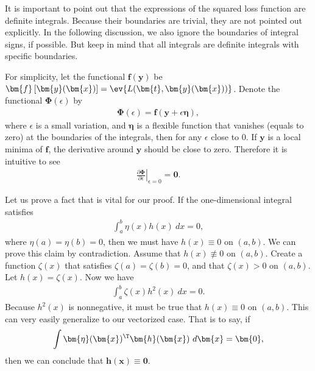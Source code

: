 \begin{answer}{}
	It is important to point out that the expressions of the squared loss function are definite integrals. Because their boundaries are trivial, they are not pointed out explicitly. In the following discussion, we also ignore the boundaries of integral signs, if possible. But keep in mind that all integrals are definite integrals with specific boundaries.
	
	For simplicity, let the functional $\bm{f}(\bm{y})$ be $\bm{f}\left[\bm{y}(\bm{x})\right] = \ev{L(\bm{t}, \bm{y}(\bm{x}))}$. Denote the functional $\bm{\Phi}(\epsilon)$ by
	\begin{align}
		\bm{\Phi}(\epsilon) = \bm{f}(\bm{y} + \epsilon\bm{\eta}),
	\end{align}
	where $\epsilon$ is a small variation, and $\bm{\eta}$ is a flexible function that vanishes (equals to zero) at the boundaries of the integrals, then for any $\epsilon$ close to $0$. If $\bm{y}$ is a local minima of $\bm{f}$, the derivative around $\bm{y}$ should be close to zero. Therefore it is intuitive to see
	\begin{align}\label{1.25eqn1}
		\left.\frac{\partial \bm{\Phi}}{\partial \epsilon}\right\lvert_{\epsilon = 0} = \bm{0}.
	\end{align}
	
	Let us prove a fact that is vital for our proof. If the one-dimensional integral satisfies
	\begin{align}
		\int_{a}^{b} \eta(x)h(x)\ dx = 0,
	\end{align}
	where $\eta(a) = \eta(b) = 0$, then we must have $h(x) \equiv 0$ on $(a, b)$. We can prove this claim by contradiction. Assume that $h(x) \not\equiv 0$ on $(a, b)$. Create a function $\zeta(x)$ that satisfies $\zeta(a) = \zeta(b) = 0$, and that $\zeta(x) > 0$ on $(a, b)$. Let $h(x) = \zeta(x)$. Now we have
	\begin{align}
		\int_{a}^{b} \zeta(x)h^2(x)\ dx = 0.
	\end{align}
	Because $h^2(x)$ is nonnegative, it must be true that $h(x) \equiv 0$ on $(a, b)$. This can very easily generalize to our vectorized case. That is to say, if
	\begin{align}\label{1.25eqn2}
		\int \bm{\eta}(\bm{x})^{\T} \bm{h}(\bm{x})\ d\bm{x} = \bm{0},
	\end{align}
	then we can conclude that $ \bm{h}(\bm{x}) \equiv \bm{0}$.
	

\end{answer}
